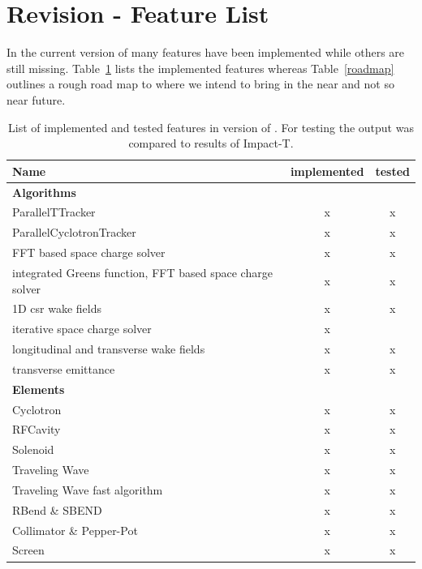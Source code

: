 \section{Revision \opalversion - Feature List}
\label{sec:featurelist}
In the current version of \opal many features have been implemented while others are still missing. 
Table~\ref{featurelist} lists the implemented features whereas Table~\ref{roadmap} outlines a rough road map to where we intend to bring \opal in the near and not so near future.
\begin{table}[ht] \footnotesize
\begin{center}
\begin{tabular}{p{5cm}cc}
\hline
{\bf Name} & {\bf implemented} & {\bf tested}\\
\hline
{\bf Algorithms} & & \\
ParallelTTracker & x & x \\
ParallelCyclotronTracker & x & x \\
FFT based space charge solver & x & x \\
integrated Greens function, FFT based space charge solver & x & x \\
1D csr wake fields & x& x\\
iterative space charge solver & x & \\
longitudinal and transverse wake fields & x& x \\
transverse emittance & x& x \\



\hline
{\bf Elements} & & \\
Cyclotron & x & x \\
RFCavity & x & x \\
Solenoid & x & x \\
Traveling Wave & x & x \\
Traveling Wave fast algorithm & x & x \\
RBend \& SBEND & x & x\\
Collimator \& Pepper-Pot & x & x\\
Screen  & x & x\\
\hline
\end{tabular}
\caption{List of implemented and tested features in version \opalversion of \opal. For testing the output was compared to results of Impact-T.}
\label{featurelist}
\end{center}
\end{table}
\clearpage
